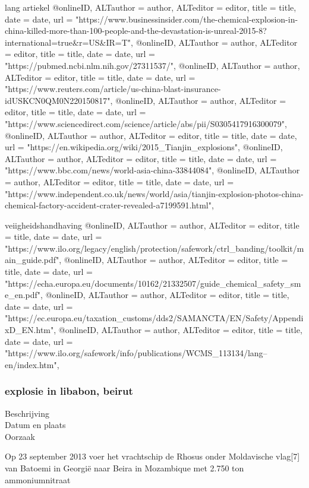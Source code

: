 {{{{{{{{{{{{{{lang artiekel
@online{ID,	ALTauthor = {author},	ALTeditor = {editor},	title = {title},	date = {date},	url = {"https://www.businessinsider.com/the-chemical-explosion-in-china-killed-more-than-100-people-and-the-devastation-is-unreal-2015-8?international=true&r=US&IR=T"},}
@online{ID,	ALTauthor = {author},	ALTeditor = {editor},	title = {title},	date = {date},	url = {"https://pubmed.ncbi.nlm.nih.gov/27311537/"},}
@online{ID,	ALTauthor = {author},	ALTeditor = {editor},	title = {title},	date = {date},	url = {"https://www.reuters.com/article/us-china-blast-insurance-idUSKCN0QM0N220150817"},}
@online{ID,	ALTauthor = {author},	ALTeditor = {editor},	title = {title},	date = {date},	url = {"https://www.sciencedirect.com/science/article/abs/pii/S0305417916300079"},}
@online{ID,	ALTauthor = {author},	ALTeditor = {editor},	title = {title},	date = {date},	url = {"https://en.wikipedia.org/wiki/2015_Tianjin_explosions"},}
@online{ID,	ALTauthor = {author},	ALTeditor = {editor},	title = {title},	date = {date},	url = {"https://www.bbc.com/news/world-asia-china-33844084"},}
@online{ID,	ALTauthor = {author},	ALTeditor = {editor},	title = {title},	date = {date},	url = {"https://www.independent.co.uk/news/world/asia/tianjin-explosion-photos-china-chemical-factory-accident-crater-revealed-a7199591.html"},}

veiigheidshandhaving
@online{ID,	ALTauthor = {author},	ALTeditor = {editor},	title = {title},	date = {date},	url = {"https://www.ilo.org/legacy/english/protection/safework/ctrl_banding/toolkit/main_guide.pdf"},}
@online{ID,	ALTauthor = {author},	ALTeditor = {editor},	title = {title},	date = {date},	url = {"https://echa.europa.eu/documents/10162/21332507/guide_chemical_safety_sme_en.pdf"},}
@online{ID,	ALTauthor = {author},	ALTeditor = {editor},	title = {title},	date = {date},	url = {"https://ec.europa.eu/taxation_customs/dds2/SAMANCTA/EN/Safety/AppendixD_EN.htm"},}
@online{ID,	ALTauthor = {author},	ALTeditor = {editor},	title = {title},	date = {date},	url = {"https://www.ilo.org/safework/info/publications/WCMS_113134/lang--en/index.htm"},}


\subsubsection{explosie in libabon, beirut }
	\begin{description}
	\item[Beschrijving]
	\item[Datum en plaats] 
	\item[Oorzaak]
\end{description}
Op 23 september 2013 voer het vrachtschip de Rhosus onder Moldavische vlag[7] van Batoemi in Georgië naar Beira in Mozambique met 2.750 ton ammoniumnitraat

}}}}}}}}}}}}}}
